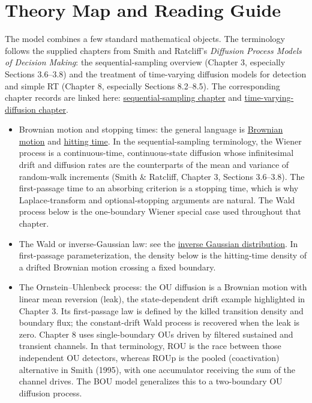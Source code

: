 \documentclass[12pt]{article}
\begin{document}
\section{Theory Map and Reading Guide}
The model combines a few standard mathematical objects. The terminology follows the supplied chapters from Smith and Ratcliff's \emph{Diffusion Process Models of Decision Making}: the sequential-sampling overview (Chapter 3, especially Sections 3.6--3.8) and the treatment of time-varying diffusion models for detection and simple RT (Chapter 8, especially Sections 8.2--8.5). The corresponding chapter records are linked here: \href{https://doi.org/10.1017/9781009652667.004}{sequential-sampling chapter} and \href{https://doi.org/10.1017/9781009652667.009}{time-varying-diffusion chapter}.
\begin{itemize}
  \item Brownian motion and stopping times: the general language is \href{https://en.wikipedia.org/wiki/Brownian_motion}{Brownian motion} and \href{https://en.wikipedia.org/wiki/Hitting_time}{hitting time}. In the sequential-sampling terminology, the Wiener process is a continuous-time, continuous-state diffusion whose infinitesimal drift and diffusion rates are the counterparts of the mean and variance of random-walk increments (Smith \& Ratcliff, Chapter 3, Sections 3.6--3.8). The first-passage time to an absorbing criterion is a stopping time, which is why Laplace-transform and optional-stopping arguments are natural. The Wald process below is the one-boundary Wiener special case used throughout that chapter.
  \item The Wald or inverse-Gaussian law: see the \href{https://en.wikipedia.org/wiki/Inverse_Gaussian_distribution}{inverse Gaussian distribution}. In first-passage parameterization, the density below is the hitting-time density of a drifted Brownian motion crossing a fixed boundary.
  \item The Ornstein--Uhlenbeck process: the OU diffusion is a Brownian motion with linear mean reversion (leak), the state-dependent drift example highlighted in Chapter 3. Its first-passage law is defined by the killed transition density and boundary flux; the constant-drift Wald process is recovered when the leak is zero. Chapter 8 uses single-boundary OUs driven by filtered sustained and transient channels. In that terminology, ROU is the race between those independent OU detectors, whereas ROUp is the pooled (coactivation) alternative in Smith (1995), with one accumulator receiving the sum of the channel drives. The BOU model generalizes this to a two-boundary OU diffusion process.

\end{itemize}
\end{document}
